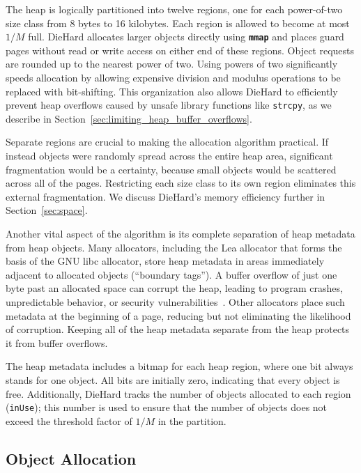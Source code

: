 \documentclass{sig-alternate}
\newcommand{\cfunction}[1]{{\bf \tt #1}}
\newcommand{\mmap}{\cfunction{mmap}}
\begin{document}
The heap is logically partitioned into twelve regions, one for each
power-of-two size class from 8 bytes to 16 kilobytes. Each region is
allowed to become at most $1/M$ full. DieHard allocates larger objects
directly using \mmap{} and places guard pages without read or write
access on either end of these regions. Object requests are rounded up
to the nearest power of two. Using powers of two significantly speeds
allocation by allowing expensive division and modulus operations to be
replaced with bit-shifting. This organization also allows DieHard to
efficiently prevent heap overflows caused by unsafe library
functions like
\texttt{strcpy}, as we describe in Section~\ref{sec:limiting_heap_buffer_overflows}.

Separate regions are crucial to making the allocation algorithm
practical. If instead objects were randomly spread across the entire
heap area, significant fragmentation would be a certainty, because
small objects would be scattered across all of the pages. Restricting
each size class to its own region eliminates this external
fragmentation. We discuss DieHard's memory efficiency further in
Section~\ref{sec:space}.

Another vital aspect of the algorithm is its complete separation of heap
metadata from heap objects. Many allocators, including the Lea
allocator that forms the basis of the GNU libc allocator, store heap
metadata in areas immediately adjacent to allocated objects
(``boundary tags''). A buffer overflow of just one byte past an
allocated space can corrupt the heap, leading to program crashes,
unpredictable behavior, or security vulnerabilities~\cite{vudo}. Other
allocators place such metadata at the beginning of a page, reducing
but not eliminating the likelihood of corruption. Keeping all of the
heap metadata separate from the heap protects it from buffer overflows.

The heap metadata includes a bitmap for each heap region, where one
bit always stands for one object. All bits are initially zero,
indicating that every object is free. Additionally, DieHard tracks the
number of objects allocated to each region ({\tt inUse}); this number
is used to ensure that the number of objects does not exceed the
threshold factor of $1/M$ in the partition.


\subsection{Object Allocation}
\end{document}
